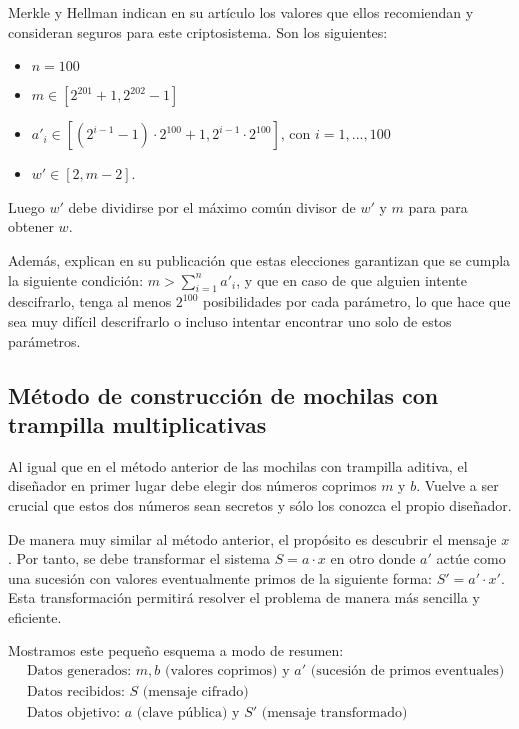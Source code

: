     \begin{observacion}
        Merkle y Hellman indican en su artículo \cite{artMH} los valores que ellos recomiendan y consideran seguros para este criptosistema. Son los siguientes: 
        \begin{itemize}
            \item $n = 100$
            \item $m \in [2^{201} + 1, 2^{202} - 1]$
            \item $a'_{i} \in [(2^{i-1} - 1) \cdot 2^{100} + 1, 2^{i-1} \cdot 2^{100}]$, con $i = 1, ... , 100$
            \item $w' \in [2, m-2]$.
        \end{itemize}
        Luego $w'$ debe dividirse por el máximo común divisor de $w'$ y $m$ para para obtener $w$.
    \end{observacion}
    
    Además, explican en su publicación que estas elecciones garantizan que se cumpla la siguiente condición: $m>\sum_{i=1}^{n} a'_{i}$, y que en caso de que alguien intente descifrarlo, tenga al menos $2^{100}$ posibilidades por cada parámetro, lo que hace que sea muy difícil descrifrarlo o incluso intentar encontrar uno solo de estos parámetros.
        
    \subsection{Método de construcción de mochilas con trampilla multiplicativas}

    Al igual que en el método anterior de las mochilas con trampilla aditiva, el diseñador en primer lugar debe elegir dos números coprimos $m$ y $b$. Vuelve a ser crucial que estos dos números sean secretos y sólo los conozca el propio diseñador.
    
    De manera muy similar al método anterior, el propósito es descubrir el mensaje $x$. Por tanto, se debe transformar el sistema $S = a \cdot x$ en otro donde $a'$ actúe como una sucesión con valores eventualmente primos de la siguiente forma: $S' = a' \cdot x'$. Esta transformación permitirá resolver el problema de manera más sencilla y eficiente.

    Mostramos este pequeño esquema a modo de resumen:
    \begin{align}
        &\text{Datos generados: } m, b \text{ (valores coprimos) y } a' \text{ (sucesión de primos eventuales)}\\
        &\text{Datos recibidos: } S \text{ (mensaje cifrado)}\\
        &\text{Datos objetivo: } a \text{ (clave pública) y } S' \text{ (mensaje transformado)}
    \end{align}
    
